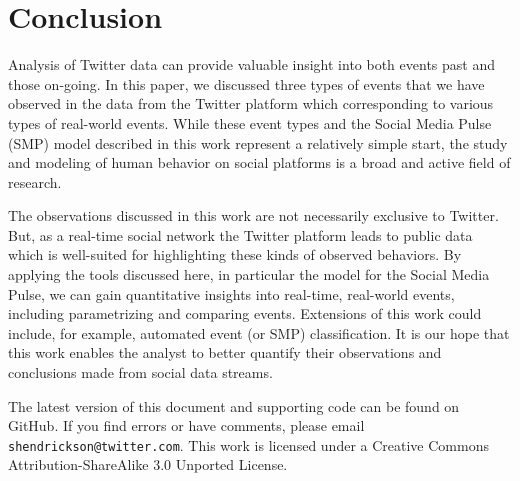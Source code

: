 \documentclass{article}
\begin{document}
\section{Conclusion} 
\label{sec:conclusion}

Analysis of Twitter data can provide valuable insight into both events past and those on-going. In this paper, we discussed three types of events that we have observed in the data from the Twitter platform which corresponding to various types of real-world events. While these event types and the Social Media Pulse (SMP) model described in this work represent a relatively simple start, the study and modeling of human behavior on social platforms is a broad and active field of research. 

The observations discussed in this work are not necessarily exclusive to Twitter. But, as a real-time social network the Twitter platform leads to public data which is well-suited for highlighting these kinds of observed behaviors. By applying the tools discussed here, in particular the model for the Social Media Pulse, we can gain quantitative insights into real-time, real-world events, including parametrizing and comparing events. Extensions of this work could include, for example, automated event (or SMP) classification. It is our hope that this work enables the analyst to better quantify their observations and conclusions made from social data streams. 

The latest version of this document and supporting code can be found on GitHub.\cite{pulse} If you find errors or have comments, please email \texttt{shendrickson@twitter.com}. This work is licensed under a Creative Commons Attribution-ShareAlike 3.0 Unported License.\cite{CreativeCommons}


      
 

\end{document}
